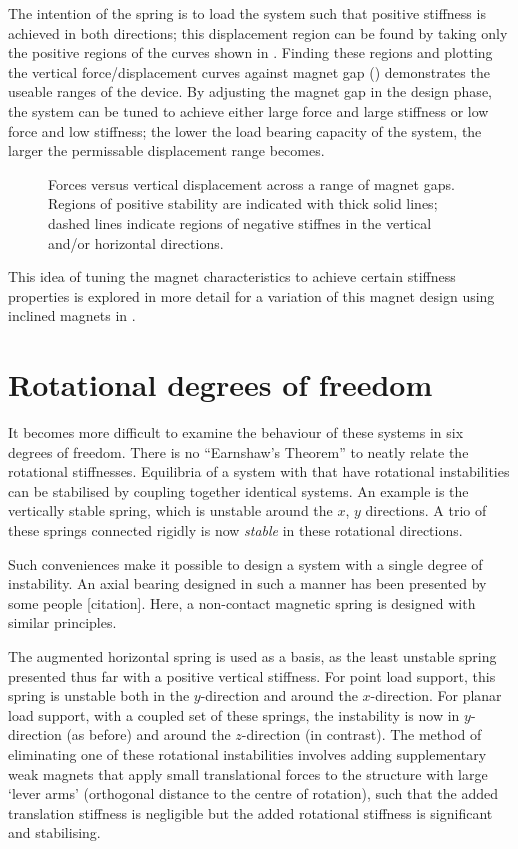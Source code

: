 \documentclass[11pt,a4paper]{memoir}
\begin{document}
The intention of the spring is to load the system such that positive stiffness is achieved in both directions; this displacement region can be found by taking only the positive regions of the curves shown in .
Finding these regions and plotting the vertical force/displacement curves against magnet gap () demonstrates the useable ranges of the device.
By adjusting the magnet gap in the design phase, the system can be tuned to achieve either large force and large stiffness or low force and low stiffness; the lower the load bearing capacity of the system, the larger the permissable displacement range becomes.

\begin{figure}
\caption{
  Forces versus vertical displacement across a range of magnet gaps.
  Regions of positive stability are indicated with thick solid lines;
  dashed lines indicate regions of negative stiffnes in the vertical and/or horizontal directions.
}
\end{figure}

This idea of tuning the magnet characteristics to achieve certain stiffness properties is explored in more detail for a variation of this magnet design using inclined magnets in .





\section{Rotational degrees of freedom}

It becomes more difficult to examine the behaviour of these systems in
six degrees of freedom. There is no ``Earnshaw's Theorem'' to neatly
relate the rotational stiffnesses. Equilibria of a system with that
have rotational instabilities can be stabilised by coupling together
identical systems. An example is the vertically stable spring, which
is unstable around the $x$, $y$ directions. A trio of these springs
connected rigidly is now \emph{stable} in these rotational directions.

Such conveniences make it possible to design a system with a single
degree of instability. An axial bearing designed in such a manner has
been presented by some people [citation]. Here, a non-contact magnetic
spring is designed with similar principles.

The augmented horizontal spring is used as a basis, as the least
unstable spring presented thus far with a positive vertical
stiffness. For point load support, this spring is unstable both in the
$y$-direction and around the $x$-direction. For planar load support,
with a coupled set of these springs, the instability is now in $y$-direction
(as before) and around the $z$-direction (in contrast). The
method of eliminating one of these rotational instabilities involves
adding supplementary weak magnets that apply small translational
forces to the structure with large `lever arms' (orthogonal distance
to the centre of rotation), such that the added translation stiffness
is negligible but the added rotational stiffness is significant and
stabilising.
\end{document}
